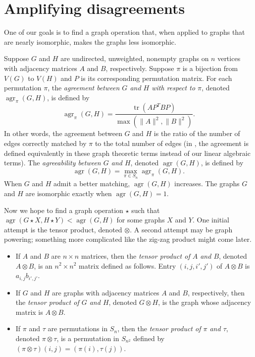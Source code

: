 \documentclass{article}
\newcommand{\1}{\mathbf{1}}
\DeclareMathOperator{\tr}{tr}
\DeclareMathOperator{\agr}{agr}
\begin{document}
\section{Amplifying disagreements}

One of our goals is to find a graph operation that, when applied to graphs that are nearly isomorphic, makes the graphs less isomorphic.

Suppose $G$ and $H$ are undirected, unweighted, nonempty graphs on $n$ vertices with adjacency matrices $A$ and $B$, respectively.
Suppose $\pi$ is a bijection from $V(G)$ to $V(H)$ and $P$ is its corresponding permutation matrix.
For each permutation $\pi$, the \emph{agreement between $G$ and $H$ with respect to $\pi$}, denoted $\agr_\pi(G, H)$, is defined by
\begin{equation*}
  \agr_\pi(G, H) = \frac{\tr(AP^TBP)}{\max(\|A\|^2, \|B\|^2)}.
\end{equation*}
In other words, the agreement between $G$ and $H$ is the ratio of the number of edges correctly matched by $\pi$ to the total number of edges (in \autocite{owwz14}, the agreement is defined equivalently in these graph theoretic terms instead of our linear algebraic terms).
The \emph{agreeability between $G$ and $H$}, denoted $\agr(G, H)$, is defined by
\begin{equation*}
  \agr(G, H) = \max_{\pi \in S_n} \agr_\pi(G, H).
\end{equation*}
When $G$ and $H$ admit a better matching, $\agr(G, H)$ increases.
The graphs $G$ and $H$ are isomorphic exactly when $\agr(G, H) = 1$.

Now we hope to find a graph operation $\star$ such that $\agr(G \star X, H \star Y) < \agr(G, H)$ for some graphs $X$ and $Y$.
One initial attempt is the tensor product, denoted $\otimes$.
A second attempt may be graph powering; something more complicated like the zig-zag product might come later.

\begin{definition}
  \mbox{}
  \begin{itemize}
  \item
    If $A$ and $B$ are $n \times n$ matrices, then the \emph{tensor product of $A$ and $B$}, denoted $A \otimes B$, is an $n^2 \times n^2$ matrix defined as follows.
    Entry $(i, j, i', j')$ of $A \otimes B$ is $a_{i, j} b_{i', j'}$.
  \item If $G$ and $H$ are graphs with adjacency matrices $A$ and $B$, respectively, then the \emph{tensor product of $G$ and $H$}, denoted $G \otimes H$, is the graph whose adjacency matrix is $A \otimes B$.
  \item If $\pi$ and $\tau$ are permutations in $S_n$, then the \emph{tensor product of $\pi$ and $\tau$}, denoted $\pi \otimes \tau$, is a permutation in $S_{n^2}$ defined by $(\pi \otimes \tau)(i, j) = (\pi(i), \tau(j))$.
  \end{itemize}
\end{definition}
\end{document}
